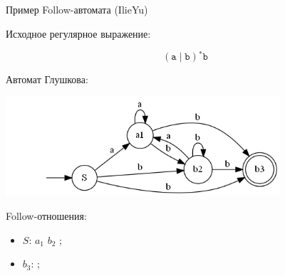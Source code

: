 \documentclass[mathserif]{beamer}
\def\alter{\ensuremath{\mathrel{\vert}}}%
\def\star{\ensuremath{^{*}}}%
\def\regexpstr#1{\mathtt{#1}}%
\begin{document}
\begin{frame}{Пример Follow-автомата (IlieYu)} {\vspace{-5pt}}
  \vspace{-5pt}
   {
    Исходное регулярное выражение:

    \[(\regexpstr{a}\alter \regexpstr{b})\star\regexpstr{b}\] %
  }
   {
    Автомат Глушкова:

    \includegraphics[width=4in, keepaspectratio]{follow1.png} %
  }
   {
    Follow-отношения:
    \begin{itemize}
      \item $S$: $a_{1}$ $b_{2}$ ; %
      \item $b_{3}$: ; %
    \end{itemize}
  }
\end{frame}

\end{document}
